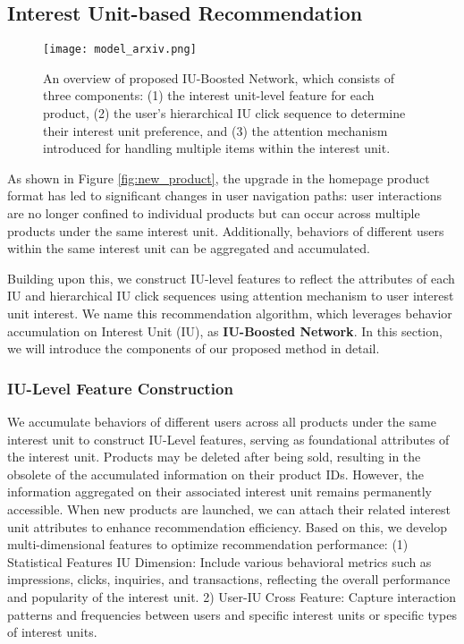 \subsection{Interest Unit-based Recommendation}\label{sec:recommendation}
\begin{figure*}[tbp]
    \texttt{[image: model\_arxiv.png]}
    \caption{An overview of proposed IU-Boosted Network, which consists of three components: (1) the interest unit-level feature for each product, (2) the user's hierarchical IU click sequence to determine their interest unit preference, and (3) the attention mechanism introduced for handling multiple items within the interest unit.}
    \label{fig:model_overview}
\end{figure*}

As shown in Figure \ref{fig:new_product}, the upgrade in the homepage product format has led to significant changes in user navigation paths: user interactions are no longer confined to individual products but can occur across multiple products under the same interest unit. Additionally, behaviors of different users within the same interest unit can be aggregated and accumulated. 

Building upon this, we construct IU-level features to reflect the attributes of each IU and hierarchical IU click sequences using attention mechanism to user interest unit interest. We name this recommendation algorithm, which leverages behavior accumulation on Interest Unit (IU), as \textbf{IU-Boosted Network}. In this section, we will introduce the components of our proposed method in detail.

\subsubsection{\textbf{IU-Level Feature Construction}}
We accumulate behaviors of different users across all products under the same interest unit to construct IU-Level features, serving as foundational attributes of the interest unit. Products may be deleted after being sold, resulting in the obsolete of the accumulated information on their product IDs. However, the information aggregated on their associated interest unit remains permanently accessible. When new products are launched, we can attach their related interest unit attributes to enhance recommendation efficiency. Based on this, we develop multi-dimensional features to optimize recommendation performance:
(1) Statistical Features IU Dimension: Include various behavioral metrics such as impressions, clicks, inquiries, and transactions, reflecting the overall performance and popularity of the interest unit.
2) User-IU Cross Feature: Capture interaction patterns and frequencies between users and specific interest units or specific types of interest units.
